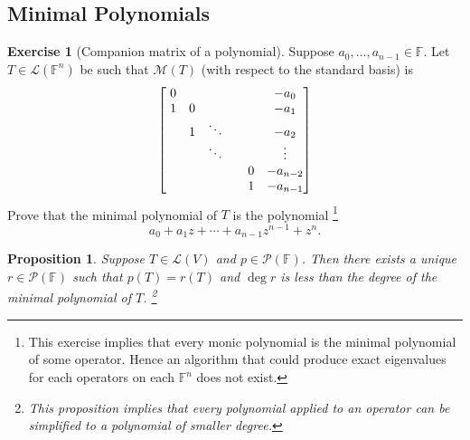 \documentclass{tufte-handout}
\theoremstyle{plain} %
\newtheorem{prop}[thm]{Proposition}
\theoremstyle{definition}
\newtheorem{exer}[thm]{Exercise}
\theoremstyle{remark}
\newcommand{\F}{\mathbb{F}}
\renewcommand{\L}{\mathcal{L}}
\newcommand{\M}{\mathcal{M}}
\renewcommand{\P}{\mathcal{P}}
\begin{document}
\subsection{Minimal Polynomials}
\begin{exer}[Companion matrix of a polynomial]
	Suppose $a_0,\dots,a_{n-1}\in\F$. Let $T\in\L(\F^n)$ be such that $\M(T)$ (with respect to the standard basis) is
	\[\begin{bmatrix}
		\hspace{0.3em}0&&&&&-a_0\\
		\hspace{0.3em}1&0&&&&-a_1\\
		\hspace{0.3em}&1&\ddots&&&-a_2\\
		\hspace{0.3em}&&\ddots&&&\vdots\\
		\hspace{0.3em}&&&&0&-a_{n-2}\\
		\hspace{0.3em}&&&&1&-a_{n-1}\\
	\end{bmatrix}\]
	Prove that the minimal polynomial of $T$ is the polynomial%
	\footnote{This exercise implies that every monic polynomial is the minimal polynomial of some operator. Hence an algorithm that could produce exact eigenvalues for each operators on each $\F^n$ does not exist.}
	\[a_0+a_1z+\cdots+a_{n-1}z^{n-1}+z^n.\]
\end{exer}

\begin{prop}
	Suppose $T\in\L(V)$ and $p\in\P(\F)$. Then there exists a unique $r\in\P(\F)$ such that $p(T)=r(T)$ and $\deg r$ is less than the degree of the minimal polynomial of $T$.%
	\footnote{This proposition implies that every polynomial applied to an operator can be simplified to a polynomial of smaller degree.}
\end{prop}
\end{document}
